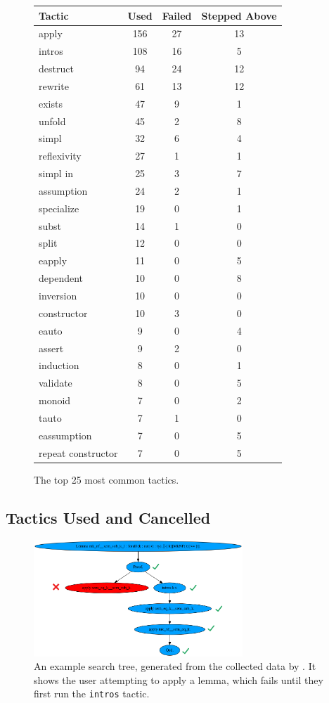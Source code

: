 \begin{figure}
\small
  \begin{tabular}{|l|c|c|c|}
    \hline
    \textbf{Tactic} & \textbf{Used} & \textbf{Failed} & \textbf{Stepped Above} \\
    \hline
    apply& 156& 27& 13\\
    intros& 108& 16& 5\\
    destruct& 94& 24& 12\\
    rewrite& 61& 13& 12\\
    exists& 47& 9& 1\\
    unfold& 45& 2& 8\\
    simpl& 32& 6& 4\\
    reflexivity& 27& 1& 1\\
    simpl in& 25& 3& 7\\
    assumption& 24& 2& 1\\
    specialize& 19& 0& 1\\
    subst& 14& 1& 0\\
    split& 12& 0& 0\\
    eapply& 11& 0& 5\\
    dependent& 10& 0& 8\\
    inversion& 10& 0& 0\\
    constructor& 10& 3& 0\\
    eauto& 9& 0& 4\\
    assert& 9& 2& 0\\
    induction& 8& 0& 1\\
    validate& 8& 0& 5\\
    monoid& 7& 0& 2\\
    tauto& 7& 1& 0\\
    eassumption& 7& 0& 5\\
    repeat constructor& 7& 0& 5\\
    \hline
  \end{tabular}
  \caption{The top 25 most common tactics.}
\label{fig:tactics-table}
\end{figure}

\subsection{Tactics Used and Cancelled}
\label{sec:tactics}

\begin{figure}
  \includegraphics[width=0.70\textwidth]{maintenance/fig/example-graph.png}
  \caption{An example search tree, generated from the collected data
    by \toolname. It shows the user attempting to apply a lemma, which
    fails until they first run the \lstinline{intros} tactic.}
  \label{fig:search-tree}
\end{figure}

